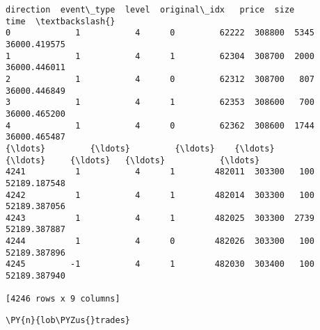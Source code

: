 \documentclass[11pt]{article}
\begin{document}
\begin{scriptsize}
            \begin{tcolorbox}[breakable, size=fbox, boxrule=.5pt, pad at break*=1mm, opacityfill=0]
\begin{Verbatim}[commandchars=\\\{\}]
      direction  event\_type  level  original\_idx   price  size          time  \textbackslash{}
0             1           4      0         62222  308800  5345  36000.419575
1             1           4      1         62304  308700  2000  36000.446011
2             1           4      0         62312  308700   807  36000.446849
3             1           4      1         62353  308600   700  36000.465200
4             1           4      0         62362  308600  1744  36000.465487
{\ldots}         {\ldots}         {\ldots}    {\ldots}           {\ldots}     {\ldots}   {\ldots}           {\ldots}
4241          1           4      1        482011  303300   100  52189.187548
4242          1           4      1        482014  303300   100  52189.387056
4243          1           4      1        482025  303300  2739  52189.387887
4244          1           4      0        482026  303300   100  52189.387896
4245         -1           4      1        482030  303400   100  52189.387940

[4246 rows x 9 columns]
\end{Verbatim}
\end{tcolorbox}
\end{scriptsize}
        
    \begin{tcolorbox}[breakable, size=fbox, boxrule=1pt, pad at break*=1mm,colback=cellbackground, colframe=cellborder]
\begin{Verbatim}[commandchars=\\\{\}]
\PY{n}{lob\PYZus{}trades}
\end{Verbatim}
\end{tcolorbox}
\end{document}
